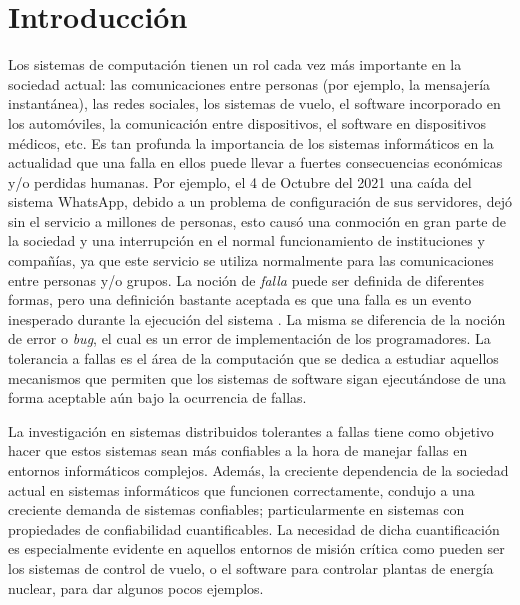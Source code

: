 \chapter{Introducción}
\label{cap:introduccion}
Los sistemas de computación tienen un rol cada vez más importante en la sociedad actual: las comunicaciones entre personas (por ejemplo, la mensajería instantánea), las redes sociales, los sistemas de vuelo, el software incorporado en los automóviles, la comunicación entre dispositivos, el software en dispositivos médicos, etc. Es tan profunda la importancia de los sistemas informáticos en la actualidad que una falla en ellos puede llevar a fuertes consecuencias económicas y/o perdidas humanas. Por ejemplo, el 4 de Octubre del 2021 una caída del sistema WhatsApp, debido a un problema de configuración de sus servidores, dejó sin el servicio a millones de personas, esto causó una conmoción en gran parte de la sociedad y una interrupción en el normal funcionamiento de instituciones y compañías, ya que este servicio se utiliza normalmente para las comunicaciones entre personas y/o grupos. La noción de \emph{falla} puede ser definida de diferentes formas, pero una definición bastante aceptada es que una falla es un evento inesperado durante la ejecución del sistema \cite{Aviziens76}. La misma se diferencia de la noción de error o \textit{bug}, el cual es un error de implementación de los programadores. La tolerancia a fallas es el área de la computación que se dedica a estudiar aquellos mecanismos que permiten que los sistemas de software sigan ejecutándose de una forma aceptable aún bajo la ocurrencia de fallas.

La investigación en sistemas distribuidos tolerantes a fallas tiene como objetivo hacer que estos sistemas sean más confiables a la hora de manejar fallas en entornos informáticos complejos. Además, la creciente dependencia de la sociedad actual en sistemas informáticos que funcionen correctamente, condujo a una creciente demanda de sistemas confiables; particularmente en sistemas con propiedades de confiabilidad cuantificables. La necesidad de dicha cuantificación es especialmente evidente en aquellos entornos de misión crítica como pueden ser los sistemas de control de vuelo, o el software para controlar plantas de energía nuclear, para dar algunos pocos ejemplos.

